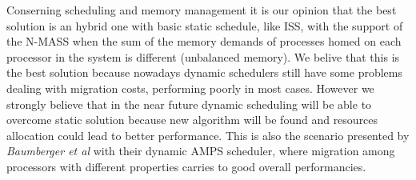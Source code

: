 \documentclass[a4paper,10pt]{article}
\begin{document}
\begin{multicols}{2}
Conserning scheduling and memory management it is our opinion that the best solution is an hybrid one with basic static schedule, like ISS, with the support of the N-MASS when the sum of the memory demands of processes homed on each processor in the system is different (unbalanced memory). We belive that this is the best solution because nowadays dynamic schedulers still have some problems dealing with migration costs, performing poorly in most cases.
However we strongly believe that in the near future dynamic scheduling will be able to overcome static solution because new algorithm will be found and resources allocation could lead to better performance. This is also the scenario presented by \emph{Baumberger et al} with their dynamic AMPS scheduler, where migration among processors with different properties carries to good overall performancies.





\end{multicols}
\end{document}
